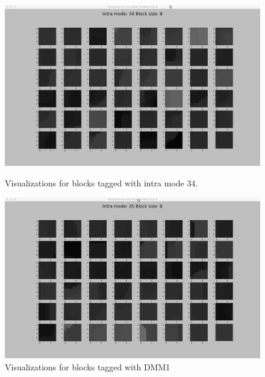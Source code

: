     \begin{figure}
        \vspace*{1cm} %
        \begin{minipage}{0.49\textwidth}
            \includegraphics[width=\linewidth]{Figures/visu-size8x8/8-34}
            \caption[Visualizations for blocks tagged with intra mode 34]{Visualizations for blocks tagged with intra mode 34.}
            \label{fig:size8_mode34}
        \end{minipage}
        \hspace{\fill} %
        \begin{minipage}{0.49\textwidth}
            \includegraphics[width=\linewidth]{Figures/visu-size8x8/8-35}
            \caption[Visualizations for blocks tagged with DMM1]{Visualizations for blocks tagged with DMM1}
            \label{fig:size8_mode35}
        \end{minipage}
    

\end{figure}
